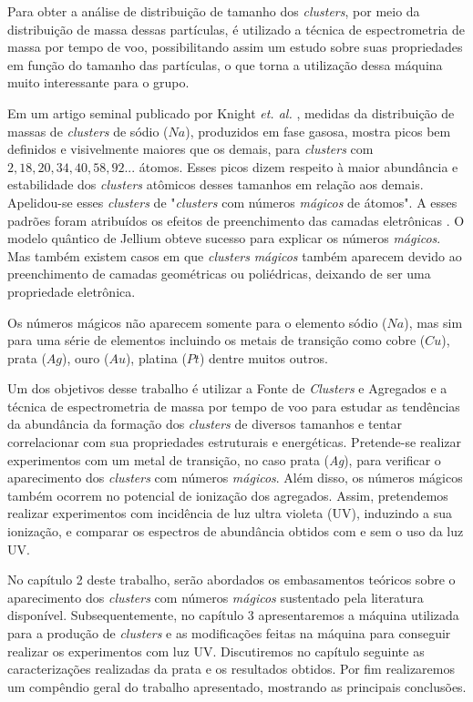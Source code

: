 Para obter a análise de distribuição de tamanho dos \textit{clusters}, por meio da distribuição de massa dessas partículas, é utilizado a técnica de espectrometria de massa por tempo de voo, possibilitando assim um estudo sobre suas propriedades em função do tamanho das partículas, o que torna a utilização dessa máquina muito interessante para o grupo.


Em um artigo seminal publicado por Knight \textit{et. al.} \cite{electronic_Shell_sodium}, medidas da distribuição de massas de \textit{clusters} de sódio ($Na$), produzidos em fase gasosa, mostra picos bem definidos e visivelmente maiores que os demais, para \textit{clusters} com $2, 18, 20, 34, 40, 58,92 ...$ átomos. Esses picos dizem respeito à maior abundância e estabilidade dos \textit{clusters} atômicos desses tamanhos em relação aos demais. Apelidou-se esses \textit{clusters} de "\textit{clusters} com números
\textit{mágicos} de átomos". A esses padrões foram atribuídos os efeitos de preenchimento das camadas eletrônicas \cite{Brack}. O modelo quântico de Jellium \cite{jellium} obteve sucesso para explicar os números \textit{mágicos}. Mas também existem casos em que \textit{clusters} \textit{mágicos} também aparecem devido ao preenchimento de camadas geométricas ou poliédricas, deixando de ser uma propriedade eletrônica.


Os números mágicos não aparecem somente para o elemento sódio ($Na$), mas sim para uma série de elementos incluindo os metais de transição como \cite{magic_1B}  cobre ($Cu$), prata ($Ag$), ouro ($Au$), platina ($Pt$) dentre muitos outros.

Um dos objetivos desse trabalho é utilizar a Fonte de \textit{Clusters} e Agregados e a técnica de espectrometria de massa por tempo de voo para estudar as tendências da abundância da formação dos \textit{clusters} de diversos tamanhos e tentar correlacionar com sua propriedades estruturais e energéticas. Pretende-se realizar experimentos com um metal de transição, no caso prata (\textit{Ag}), para verificar o aparecimento dos \textit{clusters} com números \textit{mágicos}. Além disso, os números mágicos também ocorrem no potencial de ionização dos agregados. Assim, pretendemos realizar experimentos com incidência de luz ultra violeta (UV), induzindo a sua ionização, e comparar os espectros de abundância obtidos com e sem o uso da luz UV. 

No capítulo 2 deste trabalho, serão  abordados os embasamentos teóricos sobre o aparecimento dos \textit{clusters} com números \textit{mágicos} sustentado pela literatura disponível. Subsequentemente, no capítulo 3 apresentaremos a máquina utilizada para a produção de \textit{clusters} e as modificações feitas na máquina para conseguir realizar os experimentos com luz UV. Discutiremos no capítulo seguinte as caracterizações
realizadas da prata e os resultados obtidos. Por fim realizaremos um
compêndio geral do trabalho apresentado, mostrando as principais conclusões. 



 